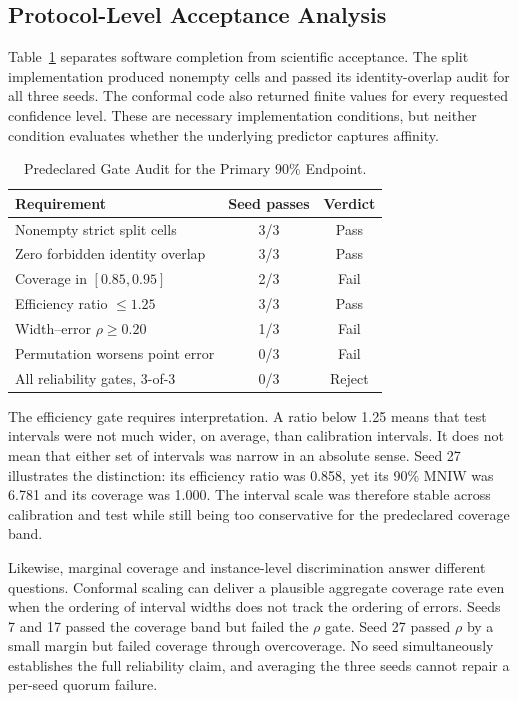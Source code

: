\documentclass[lettersize,journal]{IEEEtran}
\begin{document}
\subsection{Protocol-Level Acceptance Analysis}
Table~\ref{tab:gates} separates software completion from scientific acceptance. The split implementation produced nonempty cells and passed its identity-overlap audit for all three seeds. The conformal code also returned finite values for every requested confidence level. These are necessary implementation conditions, but neither condition evaluates whether the underlying predictor captures affinity.

\begin{table}[!t]
\caption{Predeclared Gate Audit for the Primary 90\% Endpoint.}
\label{tab:gates}
\centering
\begin{tabular}{p{}cc}
\toprule
Requirement & Seed passes & Verdict \\
\midrule
Nonempty strict split cells & 3/3 & Pass \\
Zero forbidden identity overlap & 3/3 & Pass \\
Coverage in $[0.85,0.95]$ & 2/3 & Fail \\
Efficiency ratio $\le1.25$ & 3/3 & Pass \\
Width--error $\rho\ge0.20$ & 1/3 & Fail \\
Permutation worsens point error & 0/3 & Fail \\
All reliability gates, 3-of-3 & 0/3 & Reject \\
\bottomrule
\end{tabular}
\end{table}

The efficiency gate requires interpretation. A ratio below 1.25 means that test intervals were not much wider, on average, than calibration intervals. It does not mean that either set of intervals was narrow in an absolute sense. Seed 27 illustrates the distinction: its efficiency ratio was 0.858, yet its 90\% MNIW was 6.781 and its coverage was 1.000. The interval scale was therefore stable across calibration and test while still being too conservative for the predeclared coverage band.

Likewise, marginal coverage and instance-level discrimination answer different questions. Conformal scaling can deliver a plausible aggregate coverage rate even when the ordering of interval widths does not track the ordering of errors. Seeds 7 and 17 passed the coverage band but failed the $\rho$ gate. Seed 27 passed $\rho$ by a small margin but failed coverage through overcoverage. No seed simultaneously establishes the full reliability claim, and averaging the three seeds cannot repair a per-seed quorum failure.
\end{document}
